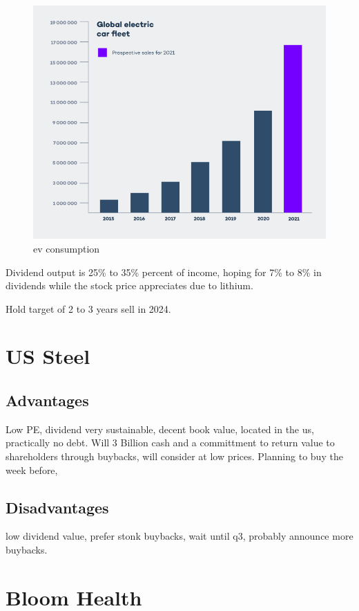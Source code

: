 \begin{figure}
\includegraphics[width=\linewidth]{src/content/images/ev_2021.png}
\caption{ev consumption}
\end{figure}

Dividend output is 25\% to 35\% percent of income, hoping for 7\% to 8\% in dividends while the stock price appreciates due to lithium.

Hold target of 2 to 3 years sell in 2024.

\section{US Steel}
\subsection{Advantages}

Low PE, dividend very sustainable, decent book value, located in the us, practically no debt. Will 3 Billion cash and a committment to return value to shareholders through buybacks, will consider at low prices.
Planning to buy the week before, 

\subsection{Disadvantages}
low dividend value, prefer stonk buybacks, wait until q3, probably announce more buybacks.

\section{Bloom Health}


